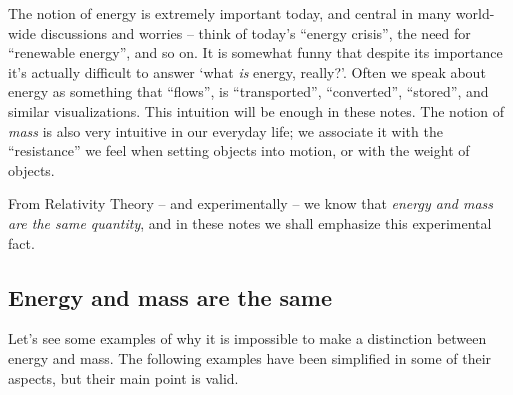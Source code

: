 \documentclass[a4paper,12pt,%
onecolumn,oneside,titlepage,%
british%
]{memoir}
\renewcommand*{\|}[1][]{\nonscript\:#1\vert\nonscript\:\mathopen{}}
\begin{document}
%
%
The notion of energy is extremely important today, and central in many world-wide discussions and worries -- think of today's \enquote{energy crisis}, the need for \enquote{renewable energy}, and so on. It is somewhat funny that despite its importance it's actually difficult to answer \enquote*{what \emph{is} energy, really?}. Often we speak about energy as something that \enquote{flows}, is \enquote{transported}, \enquote{converted}, \enquote{stored}, and similar visualizations. This intuition will be enough in these notes. The notion of \emph{mass} is also very intuitive in our everyday life; we associate it with the \enquote{resistance} we feel when setting objects into motion, or with the weight of objects.

From Relativity Theory -- and experimentally -- we know that \emph{energy and mass are the same quantity}, and in these notes we shall emphasize this experimental fact.


\subsection{Energy and mass are the same}
\label{sec:mass_is_energy}

Let's see some examples of why it is impossible to make a distinction between energy and mass. The following examples have been simplified in some of their aspects, but their main point is valid.
\end{document}

